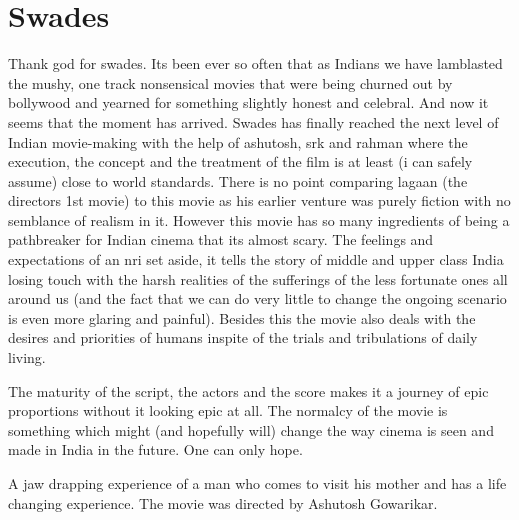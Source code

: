 \documentclass{article}
\begin{document}
\section*{Swades}


Thank god for swades. Its been ever so often that as Indians we have lamblasted the mushy, one track nonsensical movies that were being churned out by bollywood and yearned for something slightly honest and celebral. And now it seems that the moment has arrived. Swades has finally reached the next level of Indian movie-making with the help of ashutosh, srk and rahman where the execution, the concept and the treatment of the film is at least (i can safely assume) close to world standards. There is no point comparing lagaan (the directors 1st movie) to this movie as his earlier venture was purely fiction with no semblance of realism in it. However this movie has so many ingredients of being a pathbreaker for Indian cinema that its almost scary. The feelings and expectations of an nri set aside, it tells the story of middle and upper class India losing touch with the harsh realities of the sufferings of the less fortunate ones all around us (and the fact that we can do very little to change the ongoing scenario is even more glaring and painful). Besides this the movie also deals with the desires and priorities of humans inspite of the trials and tribulations of daily living.

The maturity of the script, the actors and the score makes it a journey of epic proportions without it looking epic at all. The normalcy of the movie is something which might (and hopefully will) change the way cinema is seen and made in India in the future. One can only hope.

A jaw drapping experience of a man who comes to visit his mother and has a life changing experience.
The movie was directed by Ashutosh Gowarikar.
\end{document}
